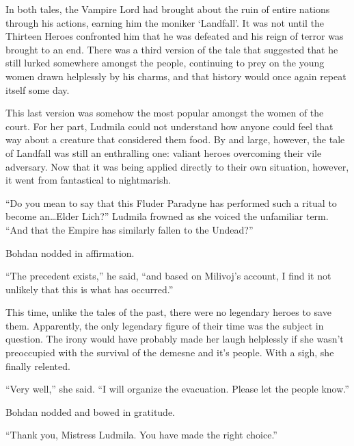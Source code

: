  

In both tales, the Vampire Lord had brought about the ruin of entire nations through his actions, earning him the moniker ‘Landfall’. It was not until the Thirteen Heroes confronted him that he was defeated and his reign of terror was brought to an end. There was a third version of the tale that suggested that he still lurked somewhere amongst the people, continuing to prey on the young women drawn helplessly by his charms, and that history would once again repeat itself some day.

 

This last version was somehow the most popular amongst the women of the court. For her part, Ludmila could not understand how anyone could feel that way about a creature that considered them food. By and large, however, the tale of Landfall was still an enthralling one: valiant heroes overcoming their vile adversary. Now that it was being applied directly to their own situation, however, it went from fantastical to nightmarish.

 

“Do you mean to say that this Fluder Paradyne has performed such a ritual to become an…Elder Lich?” Ludmila frowned as she voiced the unfamiliar term. “And that the Empire has similarly fallen to the Undead?”

 

Bohdan nodded in affirmation.

 

“The precedent exists,” he said, “and based on Milivoj’s account, I find it not unlikely that this is what has occurred.”

 

This time, unlike the tales of the past, there were no legendary heroes to save them. Apparently, the only legendary figure of their time was the subject in question. The irony would have probably made her laugh helplessly if she wasn’t preoccupied with the survival of the demesne and it’s people. With a sigh, she finally relented.

 

“Very well,” she said. “I will organize the evacuation. Please let the people know.”

 

Bohdan nodded and bowed in gratitude.

 

“Thank you, Mistress Ludmila. You have made the right choice.”